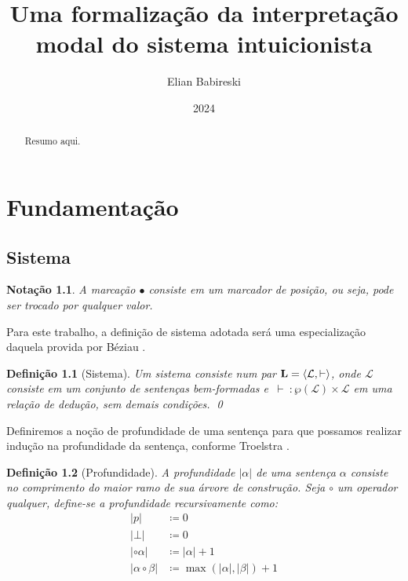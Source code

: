 \documentclass{report}
\newtheorem{notation}{Notação}
\newtheorem{definition}{Definição}
\begin{document}
    \title{Uma formalização da interpretação modal do sistema intuicionista}
    \author{Elian Babireski}
    \date{2024}

    \maketitle

    \begin{abstract}
        Resumo aqui.
    \end{abstract}

    \tableofcontents

    
    

    \chapter{Fundamentação}

    \section{Sistema}

    \begin{notation}
        A marcação $\bullet$ consiste em um marcador de posição, ou seja, pode ser trocado por qualquer valor. 
    \end{notation}

    Para este trabalho, a definição de sistema adotada será uma especialização daquela provida por Béziau \cite{Beziau}.

    \begin{definition}[Sistema]
        Um sistema consiste num par $\mathbf{L} = \langle\mathcal{L}, \vdash\rangle$, onde $\mathcal{L}$ consiste em um conjunto de sentenças bem-formadas e $\, \vdash \: : \wp(\mathcal{L}) \times \mathcal{L} $ em uma relação de dedução, sem demais condições.
        \qed
    \end{definition}

    Definiremos a noção de profundidade de uma sentença para que possamos realizar indução na profundidade da sentença, conforme Troelstra \cite{Troelstra}.

    \begin{definition}[Profundidade]
        A profundidade $|\alpha|$ de uma sentença $\alpha$ consiste no comprimento do maior ramo de sua árvore de construção. Seja $\circ$ um operador qualquer, define-se a profundidade recursivamente como:
        \begin{align*}
            |p|                  & \coloneqq 0                           \\
            |\bot|               & \coloneqq 0                           \\
            |\circ \alpha|       & \coloneqq |\alpha| + 1                \\
            |\alpha \circ \beta| & \coloneqq \max(|\alpha|, |\beta|) + 1
            \tag*{\qed} 
        \end{align*}
    \end{definition}
\end{document}
